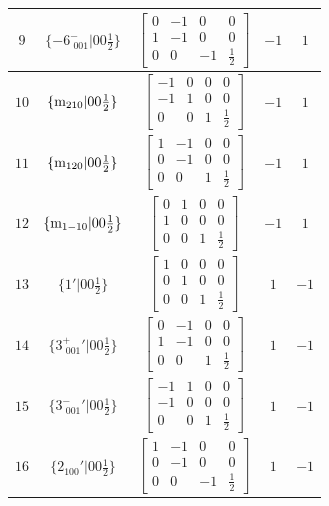 \documentclass[fleqn,8pt]{jsarticle}
\begin{document}
\begin{longtable}{ccccc}
$ 9 $ & $ \{-6^{-}_{\,\,001}|0 0 \frac{1}{2}\} $ & $ \begin{bmatrix} 0 & -1 & 0 & 0 \\ 1 & -1 & 0 & 0 \\ 0 & 0 & -1 & \frac{1}{2} \end{bmatrix} $ & $ -1 $ & $ 1 $ \\ \hline
$ 10 $ & $ \{{\rm m}_{210}|0 0 \frac{1}{2}\} $ & $ \begin{bmatrix} -1 & 0 & 0 & 0 \\ -1 & 1 & 0 & 0 \\ 0 & 0 & 1 & \frac{1}{2} \end{bmatrix} $ & $ -1 $ & $ 1 $ \\ \hline
$ 11 $ & $ \{{\rm m}_{120}|0 0 \frac{1}{2}\} $ & $ \begin{bmatrix} 1 & -1 & 0 & 0 \\ 0 & -1 & 0 & 0 \\ 0 & 0 & 1 & \frac{1}{2} \end{bmatrix} $ & $ -1 $ & $ 1 $ \\ \hline
$ 12 $ & $ \{{\rm m}_{1-10}|0 0 \frac{1}{2}\} $ & $ \begin{bmatrix} 0 & 1 & 0 & 0 \\ 1 & 0 & 0 & 0 \\ 0 & 0 & 1 & \frac{1}{2} \end{bmatrix} $ & $ -1 $ & $ 1 $ \\ \hline
$ 13 $ & $ \{1{}'|0 0 \frac{1}{2}\} $ & $ \begin{bmatrix} 1 & 0 & 0 & 0 \\ 0 & 1 & 0 & 0 \\ 0 & 0 & 1 & \frac{1}{2} \end{bmatrix} $ & $ 1 $ & $ -1 $ \\ \hline
$ 14 $ & $ \{3^{+}_{\,\,001}{}'|0 0 \frac{1}{2}\} $ & $ \begin{bmatrix} 0 & -1 & 0 & 0 \\ 1 & -1 & 0 & 0 \\ 0 & 0 & 1 & \frac{1}{2} \end{bmatrix} $ & $ 1 $ & $ -1 $ \\ \hline
$ 15 $ & $ \{3^{-}_{\,\,001}{}'|0 0 \frac{1}{2}\} $ & $ \begin{bmatrix} -1 & 1 & 0 & 0 \\ -1 & 0 & 0 & 0 \\ 0 & 0 & 1 & \frac{1}{2} \end{bmatrix} $ & $ 1 $ & $ -1 $ \\ \hline
$ 16 $ & $ \{2{}_{100}{}'|0 0 \frac{1}{2}\} $ & $ \begin{bmatrix} 1 & -1 & 0 & 0 \\ 0 & -1 & 0 & 0 \\ 0 & 0 & -1 & \frac{1}{2} \end{bmatrix} $ & $ 1 $ & $ -1 $ \\ \hline

\end{longtable}
\end{document}
